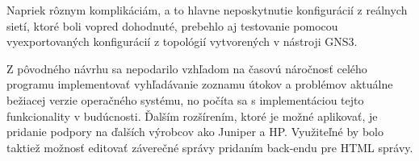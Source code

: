 Napriek rôznym komplikáciám, a to hlavne neposkytnutie konfigurácií z reálnych sietí, ktoré boli vopred dohodnuté, prebehlo aj testovanie pomocou vyexportovaných konfigurácií z topológií vytvorených v nástroji GNS3.

Z pôvodného návrhu sa nepodarilo vzhľadom na časovú náročnosť celého programu implementovať vyhľadávanie zoznamu útokov a problémov aktuálne bežiacej verzie operačného systému, no počíta sa s implementáciou tejto funkcionality v budúcnosti. Ďalším rozšírením, ktoré je možné aplikovať, je pridanie podpory na ďalších výrobcov ako Juniper a HP. Využiteľné by bolo taktiež možnosť editovať záverečné správy pridaním back-endu pre HTML správy.
